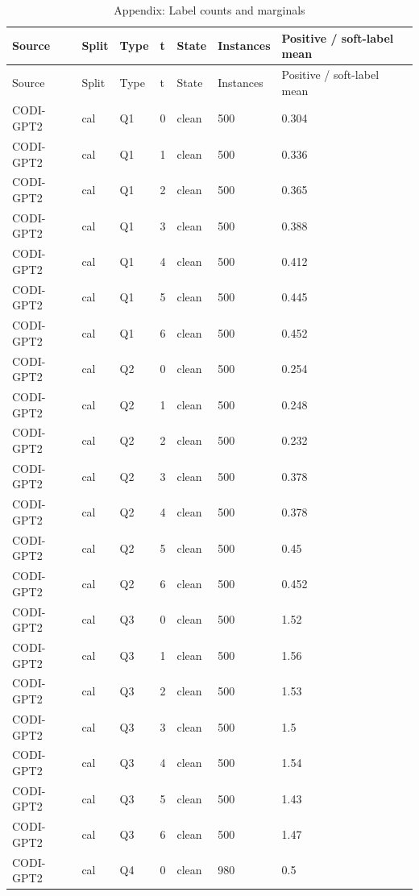 \begingroup\scriptsize\setlength{\tabcolsep}{3pt}
\begin{longtable}{@{}p{}p{}p{}p{}p{}p{}p{}@{}}
\caption{Appendix: Label counts and marginals}\label{tab:appendix-labels}\\
\toprule
Source & Split & Type & t & State & Instances & Positive / soft-label mean \\
\midrule\endfirsthead
\toprule
Source & Split & Type & t & State & Instances & Positive / soft-label mean \\
\midrule\endhead
CODI-GPT2 & cal & Q1 & 0 & clean & 500 & 0.304 \\
CODI-GPT2 & cal & Q1 & 1 & clean & 500 & 0.336 \\
CODI-GPT2 & cal & Q1 & 2 & clean & 500 & 0.365 \\
CODI-GPT2 & cal & Q1 & 3 & clean & 500 & 0.388 \\
CODI-GPT2 & cal & Q1 & 4 & clean & 500 & 0.412 \\
CODI-GPT2 & cal & Q1 & 5 & clean & 500 & 0.445 \\
CODI-GPT2 & cal & Q1 & 6 & clean & 500 & 0.452 \\
CODI-GPT2 & cal & Q2 & 0 & clean & 500 & 0.254 \\
CODI-GPT2 & cal & Q2 & 1 & clean & 500 & 0.248 \\
CODI-GPT2 & cal & Q2 & 2 & clean & 500 & 0.232 \\
CODI-GPT2 & cal & Q2 & 3 & clean & 500 & 0.378 \\
CODI-GPT2 & cal & Q2 & 4 & clean & 500 & 0.378 \\
CODI-GPT2 & cal & Q2 & 5 & clean & 500 & 0.45 \\
CODI-GPT2 & cal & Q2 & 6 & clean & 500 & 0.452 \\
CODI-GPT2 & cal & Q3 & 0 & clean & 500 & 1.52 \\
CODI-GPT2 & cal & Q3 & 1 & clean & 500 & 1.56 \\
CODI-GPT2 & cal & Q3 & 2 & clean & 500 & 1.53 \\
CODI-GPT2 & cal & Q3 & 3 & clean & 500 & 1.5 \\
CODI-GPT2 & cal & Q3 & 4 & clean & 500 & 1.54 \\
CODI-GPT2 & cal & Q3 & 5 & clean & 500 & 1.43 \\
CODI-GPT2 & cal & Q3 & 6 & clean & 500 & 1.47 \\
CODI-GPT2 & cal & Q4 & 0 & clean & 980 & 0.5 \\

\end{longtable}
